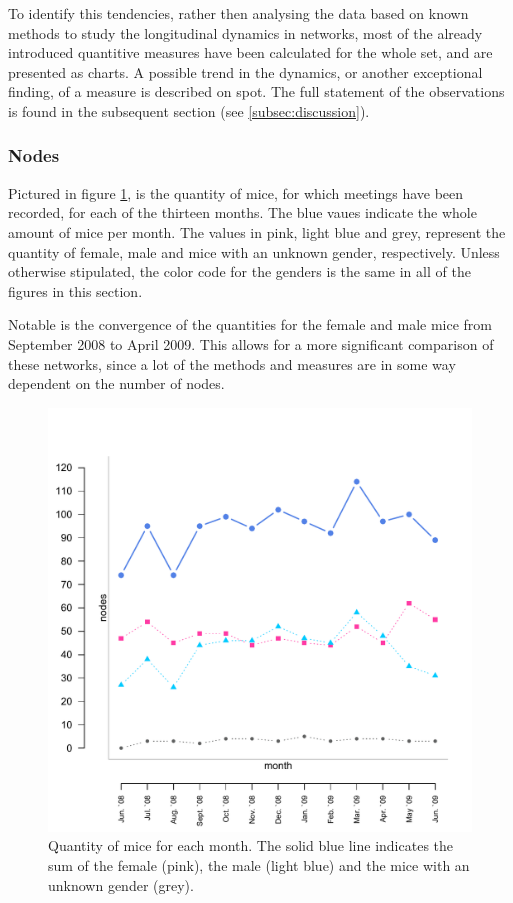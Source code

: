 To identify this tendencies, rather then analysing the data based on known methods to study the longitudinal dynamics in networks\cite{snijders:05}, most of the already introduced quantitive measures have been calculated for the whole set, and are presented as charts. A possible trend in the dynamics, or another exceptional finding, of a measure is described on spot. The full statement of the observations is found in the subsequent section (see \ref{subsec:discussion}).  

\subsubsection*{Nodes}

Pictured in figure \ref{fig:long_node}, is the quantity of mice, for which meetings have been recorded, for each of the thirteen months. The blue vaues indicate the whole amount of mice per month. The values in pink, light blue and grey, represent the quantity of female, male and mice with an unknown gender, respectively. Unless otherwise stipulated, the color code for the genders is the same in all of the figures in this section.

Notable is the convergence of the quantities for the female and male mice from September 2008 to April 2009. This allows for a more significant comparison of these networks, since a lot of the methods and measures are in some way dependent on the number of nodes.  

\begin{figure}[htpb]
\begin{center}
  \includegraphics[width=.6\textwidth]{assets/pdf/long_nodes.pdf}
  \caption[Number of mice over the months]{Quantity of mice for each month. The solid blue line indicates the sum of the female (pink), the male (light blue) and the mice with an unknown gender (grey).}
  \label{fig:long_node}
\end{center}
\end{figure}

